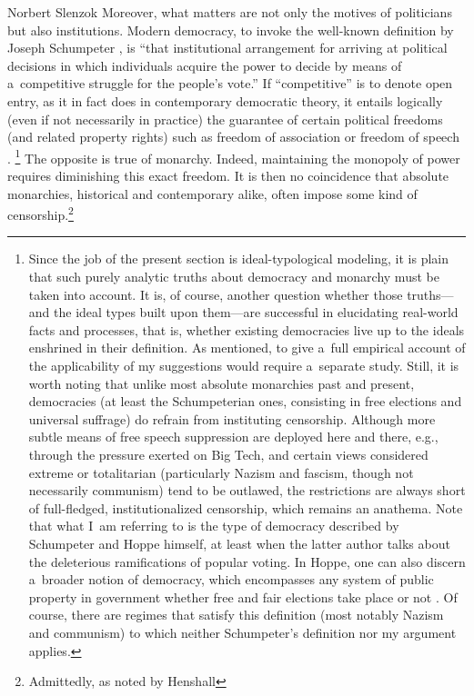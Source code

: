\begin{artengenv}{Norbert Slenzok}
Moreover, what matters are not only the motives of politicians but also institutions. Modern democracy, to invoke the well-known definition by Joseph Schumpeter 
\parencite*[][p.269]{schumpeter_capitalism_2006}, %
 is ``that institutional arrangement for arriving at political decisions in which individuals acquire the power to decide by means of a~competitive struggle for the people's vote.'' If ``competitive'' is to denote open entry, as it in fact does in contemporary democratic theory, it entails logically (even if not necessarily in practice) the guarantee of certain political freedoms (and related property rights) such as freedom of association or freedom of speech 
\parencites[][]{dahl_democracy_1989}[][pp.13–14]{tilly_democracy_2007}.%
\footnote{Since the job of the present section is ideal-typological modeling, it is plain that such purely analytic truths about democracy and monarchy must be taken into account. It is, of course, another question whether those truths---and the ideal types built upon them---are successful in elucidating real-world facts and processes, that is, whether existing democracies live up to the ideals enshrined in their definition. As mentioned, to give a~full empirical account of the applicability of my suggestions would require a~separate study. Still, it is worth noting that unlike most absolute monarchies past and present, democracies (at least the Schumpeterian ones, consisting in free elections and universal suffrage) do refrain from instituting censorship. Although more subtle means of free speech suppression are deployed here and there, e.g., through the pressure exerted on Big Tech, and certain views considered extreme or totalitarian (particularly Nazism and fascism, though not necessarily communism) tend to be outlawed, the restrictions are always short of full-fledged, institutionalized censorship, which remains an anathema. Note that what I~am referring to is the type of democracy described by Schumpeter and Hoppe himself, at least when the latter author talks about the deleterious ramifications of popular voting. In Hoppe, one can also discern a~broader notion of democracy, which encompasses any system of public property in government whether free and fair elections take place or not 
\parencite[][]{nowakowski_dlaczego_2010}. %
 Of course, there are regimes that satisfy this definition (most notably Nazism and communism) to which neither Schumpeter's definition nor my argument applies. } The opposite is true of monarchy. Indeed, maintaining the monopoly of power requires diminishing this exact freedom. It is then no coincidence that absolute monarchies, historical and contemporary alike, often impose some kind of censorship.\footnote{Admittedly, as noted by Henshall 
}
\end{artengenv}
